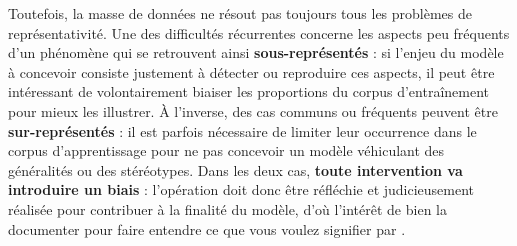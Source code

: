 			Toutefois, la masse de données ne résout pas toujours tous les problèmes de représentativité.
			Une des difficultés récurrentes concerne les aspects peu fréquents d'un phénomène qui se retrouvent ainsi \textbf{sous-représentés} : si l'enjeu du modèle à concevoir consiste justement à détecter ou reproduire ces aspects, il peut être intéressant de volontairement biaiser les proportions du corpus d'entraînement pour mieux les illustrer.
			À l'inverse, des cas communs ou fréquents peuvent être \textbf{sur-représentés} : il est parfois nécessaire de limiter leur occurrence dans le corpus d'apprentissage pour ne pas concevoir un modèle véhiculant des généralités ou des stéréotypes.
			Dans les deux cas, \textbf{toute intervention va introduire un biais} : l'opération doit donc être réfléchie et judicieusement réalisée pour contribuer à la finalité du modèle, d'où l'intérêt de bien la documenter pour faire entendre ce que vous voulez signifier par .
